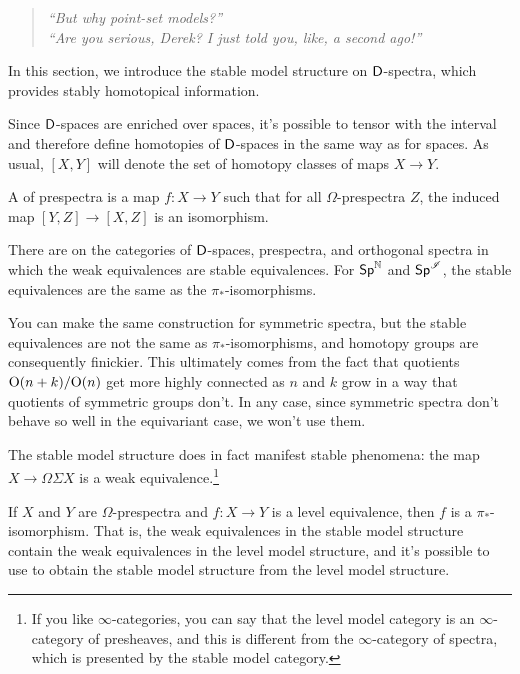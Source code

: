 \begin{quote}\textit{
	``But why point-set models?''\\
	``Are you serious, Derek? I just told you, like, a second ago!''
}\end{quote}
\label{monads}
In this section, we introduce the stable model structure on $\mathsf D$-spectra, which provides stably homotopical
information.

Since $\mathsf D$-spaces are enriched over spaces, it's possible to tensor with the interval and therefore define
homotopies of $\mathsf D$-spaces in the same way as for spaces. As usual, $[X,Y]$ will denote the set of homotopy classes
of maps $X\to Y$.
\begin{defn}
\label{stable_equivalence}
A  of prespectra is a map $f\colon X\to Y$ such that for
all $\Omega$-prespectra $Z$, the induced map $[Y,Z]\to[X,Z]$ is an isomorphism.
\end{defn}
\begin{thm}
There are  on the categories of $\mathsf D$-spaces, prespectra, and
orthogonal spectra in which the weak equivalences are stable equivalences. For $\mathsf{Sp}^\mathbb N$ and $\mathsf{Sp}^\mathscr I$, the stable
equivalences are the same as the $\pi_*$-isomorphisms.
\end{thm}
\begin{rem}
You can make the same construction for symmetric spectra, but the stable equivalences are not the same as
$\pi_*$-isomorphisms, and homotopy groups are consequently finickier. This ultimately comes from the fact that
quotients $\mathrm O(n+k)/\mathrm O(n)$ get more highly connected as $n$ and $k$ grow in a way that quotients of symmetric groups
don't. In any case, since symmetric spectra don't behave so well in the equivariant case, we won't use
them.
\end{rem}
The stable model structure does in fact manifest stable phenomena: the map $X\to\Omega\Sigma X$ is a weak
equivalence.\footnote{If you like $\infty$-categories, you can say that the level model category is an
$\infty$-category of presheaves, and this is different from the $\infty$-category of spectra, which is presented by
the stable model category.}

If $X$ and $Y$ are $\Omega$-prespectra and $f\colon X\to Y$ is a level equivalence, then $f$ is a
$\pi_*$-isomorphism. That is, the weak equivalences in the stable model structure contain the weak equivalences in
the level model structure, and it's possible to use  to obtain the stable model
structure from the level model structure.


